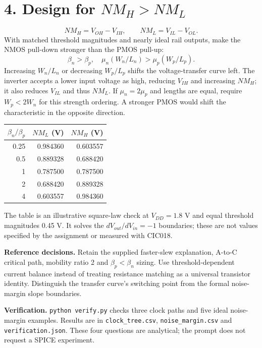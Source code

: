 \documentclass[11pt,a4paper]{article}
\begin{document}
\section*{4. Design for $NM_H>NM_L$}
\[
 NM_H=V_{OH}-V_{IH},\qquad NM_L=V_{IL}-V_{OL}.
\]
With matched threshold magnitudes and nearly ideal rail outputs, make the NMOS
pull-down stronger than the PMOS pull-up:
\[
 \boxed{\beta_n>\beta_p,\quad
 \mu_n(W_n/L_n)>\mu_p(W_p/L_p).}
\]
Increasing $W_n/L_n$ or decreasing $W_p/L_p$ shifts the voltage-transfer curve
left. The inverter accepts a lower input voltage as high, reducing $V_{IH}$
and increasing $NM_H$; it also reduces $V_{IL}$ and thus $NM_L$. If
$\mu_n=2\mu_p$ and lengths are equal, require $W_p<2W_n$ for this strength
ordering. A stronger PMOS would shift the characteristic in the opposite direction.

\begin{center}\begin{tabular}{rrr}\toprule
$\beta_n/\beta_p$&$NM_L$ (V)&$NM_H$ (V)\\\midrule
0.25&0.984360&0.603557\\
0.5&0.889328&0.688420\\
1&0.787500&0.787500\\
2&0.688420&0.889328\\
4&0.603557&0.984360\\
\bottomrule\end{tabular}\end{center}
The table is an illustrative square-law check at $V_{DD}=1.8$ V and equal
threshold magnitudes 0.45 V. It solves the $dV_{out}/dV_{in}=-1$ boundaries;
these are not values specified by the assignment or measured with CIC018.

\textbf{Reference decisions.} Retain the supplied faster-slew explanation,
A-to-C critical path, mobility ratio 2 and $\beta_p<\beta_n$ sizing.
Use threshold-dependent current balance instead of treating resistance matching
as a universal transistor identity. Distinguish the transfer curve's switching
point from the formal noise-margin slope boundaries.

\textbf{Verification.} \texttt{python verify.py} checks three clock paths and
five ideal noise-margin examples. Results are in \texttt{clock\_tree.csv},
\texttt{noise\_margin.csv} and \texttt{verification.json}. These four questions
are analytical; the prompt does not request a SPICE experiment.
\end{document}
